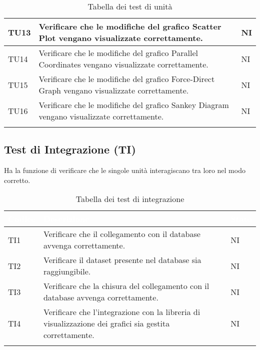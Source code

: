\begin{center}
\begin{longtable}{|p{1.5cm}|p{11cm}|p{1cm}|}
            \rowcolor[HTML]{C0C0C0}
            TU13 & Verificare che le modifiche del grafico Scatter Plot vengano visualizzate correttamente. & NI\\ \hline
            \rowcolor[HTML]{EFEFEF}
            TU14 & Verificare che le modifiche del grafico Parallel Coordinates vengano visualizzate correttamente. & NI\\ \hline
            \rowcolor[HTML]{C0C0C0}
            TU15 & Verificare che le modifiche del grafico Force-Direct Graph vengano visualizzate correttamente. & NI\\ \hline
            \rowcolor[HTML]{EFEFEF}
            TU16 & Verificare che le modifiche del grafico Sankey Diagram vengano visualizzate correttamente. & NI\\ \hline
            \caption{Tabella dei test di unità}
        \end{longtable}
    \end{center}

    \subsection{Test di Integrazione (TI)} Ha la funzione di verificare che le singole unità interagiscano tra loro nel modo corretto.
    \begin{center}
        \renewcommand\arraystretch{1.5}
        \centering
        \begin{longtable}{|p{1.5cm}|p{11cm}|p{1cm}|}
        \hline
        \rowcolor[HTML]{036400}
        \textcolor{white}{\textbf{Codice}} & \textcolor{white}{\textbf{Descrizione}} & \textcolor{white}{\textbf{Stato}} \\ \hline
            \rowcolor[HTML]{EFEFEF}
            TI1 & Verificare che il collegamento con il database avvenga correttamente. & NI\\ \hline
            \rowcolor[HTML]{C0C0C0}
            TI2 & Verificare il dataset presente nel database sia raggiungibile. & NI\\ \hline
            \rowcolor[HTML]{EFEFEF}
            TI3 & Verificare che la chisura del collegamento con il database avvenga correttamente. & NI\\ \hline
            \rowcolor[HTML]{C0C0C0}
            TI4 & Verificare che l’integrazione con la libreria di visualizzazione dei grafici sia gestita correttamente. & NI\\ \hline   
            \caption{Tabella dei test di integrazione}
        \end{longtable}
    \end{center}

